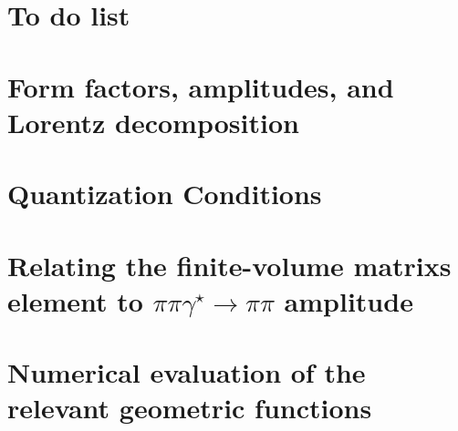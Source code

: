 \documentclass[prd,showkeys,preprintnumbers,floatfix,superscriptaddress, nofootinbib]{revtex4}
\begin{document}

\nopagebreak
\maketitle

\tableofcontents

\clearpage
\section{To do list}

\section{Form factors, amplitudes, and Lorentz decomposition}

\section{Quantization Conditions}

\section{Relating the finite-volume matrixs element to $\pi\pi\gamma^\star\to\pi\pi$ amplitude}

\section{Numerical evaluation of the relevant geometric functions}




\clearpage

\end{document}
